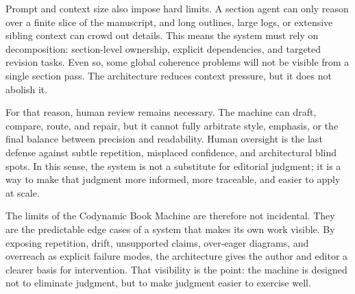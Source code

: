 Prompt and context size also impose hard limits. A section agent can only reason over a finite slice of the manuscript, and long outlines, large logs, or extensive sibling context can crowd out details. This means the system must rely on decomposition: section-level ownership, explicit dependencies, and targeted revision tasks. Even so, some global coherence problems will not be visible from a single section pass. The architecture reduces context pressure, but it does not abolish it.

For that reason, human review remains necessary. The machine can draft, compare, route, and repair, but it cannot fully arbitrate style, emphasis, or the final balance between precision and readability. Human oversight is the last defense against subtle repetition, misplaced confidence, and architectural blind spots. In this sense, the system is not a substitute for editorial judgment; it is a way to make that judgment more informed, more traceable, and easier to apply at scale.

The limits of the Codynamic Book Machine are therefore not incidental. They are the predictable edge cases of a system that makes its own work visible. By exposing repetition, drift, unsupported claims, over-eager diagrams, and overreach as explicit failure modes, the architecture gives the author and editor a clearer basis for intervention. That visibility is the point: the machine is designed not to eliminate judgment, but to make judgment easier to exercise well.

